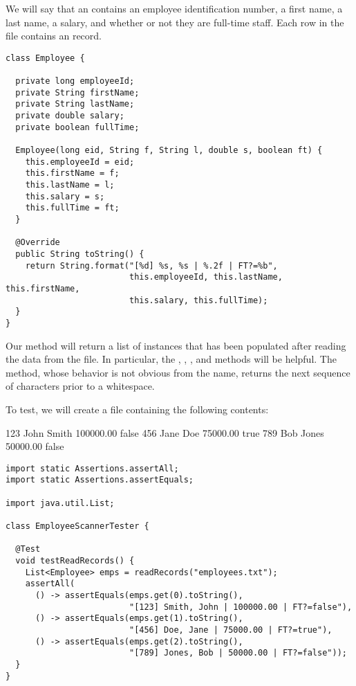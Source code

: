 We will say that an  contains an employee identification number, a first name, a last name, a salary, and whether or not they are full-time staff. Each row in the file contains an  record.

\begin{lstlisting}[language=MyJava]
class Employee {

  private long employeeId;
  private String firstName;
  private String lastName;
  private double salary;
  private boolean fullTime;
  
  Employee(long eid, String f, String l, double s, boolean ft) {
    this.employeeId = eid;
    this.firstName = f;
    this.lastName = l;
    this.salary = s;
    this.fullTime = ft;
  }

  @Override
  public String toString() {
    return String.format("[%d] %s, %s | %.2f | FT?=%b", 
                         this.employeeId, this.lastName, this.firstName, 
                         this.salary, this.fullTime);
  }
}
\end{lstlisting}

Our method will return a list of  instances that has been populated after reading the data from the file. In particular, the , , , and  methods will be helpful. The  method, whose behavior is not obvious from the name, returns the next sequence of characters prior to a whitespace. 

To test, we will create a file containing the following contents:

\begin{verbnobox}[\small]
123 John Smith 100000.00 false
456 Jane Doe 75000.00 true
789 Bob Jones 50000.00 false
\end{verbnobox}

\begin{lstlisting}[language=MyJava]
import static Assertions.assertAll;
import static Assertions.assertEquals;

import java.util.List;

class EmployeeScannerTester {

  @Test
  void testReadRecords() {
    List<Employee> emps = readRecords("employees.txt");
    assertAll(
      () -> assertEquals(emps.get(0).toString(), 
                         "[123] Smith, John | 100000.00 | FT?=false"),
      () -> assertEquals(emps.get(1).toString(), 
                         "[456] Doe, Jane | 75000.00 | FT?=true"),
      () -> assertEquals(emps.get(2).toString(), 
                         "[789] Jones, Bob | 50000.00 | FT?=false"));
  }
}
\end{lstlisting}

